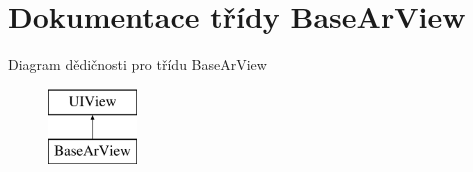 \hypertarget{interface_base_ar_view}{\section{Dokumentace třídy Base\-Ar\-View}
\label{d5/d64/interface_base_ar_view}
}
Diagram dědičnosti pro třídu Base\-Ar\-View\begin{figure}[H]
\begin{center}
\leavevmode
\includegraphics[height=2.000000cm]{d5/d64/interface_base_ar_view}
\end{center}
\end{figure}
